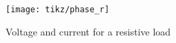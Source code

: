 \begin{figure}
	\centering
	\texttt{[image: tikz/phase\_r]}
	\caption[Voltage and current for a resistive load]{Voltage and current for a resistive load}
	\label{fig:phaser}
\end{figure}
